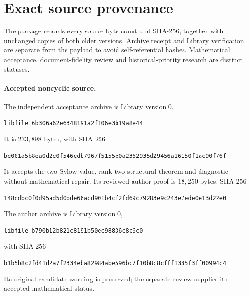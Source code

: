 \documentclass[11pt,letterpaper]{article}
\theoremstyle{definition}\newtheorem{definition}{Definition}
\newcommand{\hash}[1]{{\small\ttfamily\nolinkurl{#1}}}
\begin{document}
\section{Exact source provenance}\label{app:provenance}
The package records every source byte count and SHA-256, together with unchanged copies of both older versions. Archive receipt and Library verification are separate from the payload to avoid self-referential hashes. Mathematical acceptance, document-fidelity review and historical-priority research are distinct statuses.

\paragraph{Accepted noncyclic source.}
The independent acceptance archive is Library version $0$,
\begin{center}\hash{libfile_6b306a62e6348191a2f106e3b19a8e44}\end{center}
It is $233{,}898$ bytes, with SHA-256
\begin{center}\hash{be001a5b8ea0d2e0f546cdb7967f5155e0a2362935d29456a16150f1ac90f76f}\end{center}
It accepts the two-Sylow value, rank-two structural theorem and diagnostic without mathematical repair. Its reviewed author proof is $18{,}250$ bytes, SHA-256
\begin{center}\hash{148ddbc0f0d95ad5d0bde66acd901b4cf2fd69c79283e9c243e7ede0e13d22e0}\end{center}
The author archive is Library version $0$,
\begin{center}\hash{libfile_b790b12b821c8191b50ec98836c8c6c0}\end{center}
with SHA-256
\begin{center}\hash{b1b5b8c2fd41d2a7f2334eba82984abe596bc7f10b8c8cfff1335f3ff00994c4}\end{center}
Its original candidate wording is preserved; the separate review supplies its accepted mathematical status.
\end{document}
